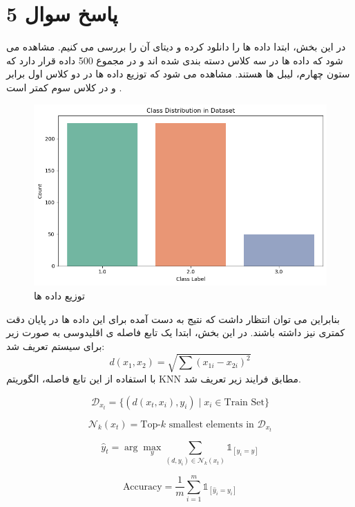\documentclass{article}
\begin{document}
\section{پاسخ سوال 5}
در این بخش، ابتدا داده ها را دانلود کرده و دیتای آن را بررسی می کنیم. مشاهده می شود که داده ها در سه کلاس دسته بندی شده اند و در مجموع 500 داده قرار دارد که ستون چهارم، لیبل ها هستند.
مشاهده می شود که توزیع داده ها در دو کلاس اول برابر و در کلاس سوم کمتر است .
\begin{figure}[h!]
	\centering
	\includegraphics[width=0.7\linewidth]{9}
	\caption[]{توزیع داده ها}
	\label{fig:9}
\end{figure}
\clearpage
بنابراین می توان انتظار داشت که نتیج به دست آمده برای این داده ها در پایان دقت کمتری نیز داشته باشند. در این بخش، ابتدا یک تابع فاصله ی اقلیدوسی به صورت زیر برای سیستم تعریف شد:
\begin{equation}
	d(x_1, x_2) = \sqrt{\sum (x_{1i} - x_{2i})^2}
\end{equation}
با استفاده از این تابع فاصله، الگوریتم KNN مطابق فرایند زیر تعریف شد.

\begin{equation}
	\mathcal{D}_{x_t} = \{(d(x_t, x_i), y_i) \mid x_i \in \text{Train Set}\}
\end{equation}

\begin{equation}
	\mathcal{N}_{k}(x_t) = \text{Top-}k \text{ smallest elements in } \mathcal{D}_{x_t}
\end{equation}

\begin{equation}
	\hat{y}_t = \arg\max_{y} \sum_{(d, y_i) \in \mathcal{N}_k(x_t)} \mathbb{1}_{[y_i = y]}
\end{equation}

\begin{equation}
	\text{Accuracy} = \frac{1}{m} \sum_{i=1}^{m} \mathbb{1}_{[\hat{y}_i = y_i]}
\end{equation}
\end{document}
